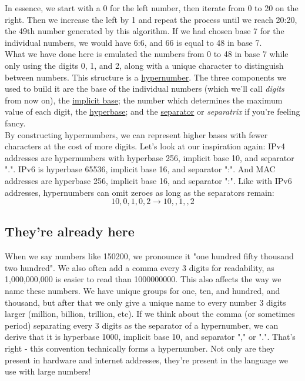 \documentclass{article}
\begin{document}
\noindent In essence, we start with a 0 for the left number, then iterate from 0 to 20 on the right. Then we increase the left by 1 and repeat the process until we reach 20:20, the 49th number generated by this algorithm. If we had chosen base 7 for the individual numbers, we would have 6:6, and 66 is equal to 48 in base 7.\\

\noindent What we have done here is emulated the numbers from 0 to 48 in base 7 while only using the digits 0, 1, and 2, along with a unique character to distinguish between numbers. This structure is a \underline{hypernumber}. The three components we used to build it are the base of the individual numbers (which we'll call \textit{digits} from now on), the \underline{implicit base}; the number which determines the maximum value of each digit, the \underline{hyperbase}; and the \underline{separator} or \textit{separatrix} if you're feeling fancy.\\

\noindent By constructing hypernumbers, we can represent higher bases with fewer characters at the cost of more digits. Let's look at our inspiration again: IPv4 addresses are hypernumbers with hyperbase 256, implicit base 10, and separator ".". IPv6 is hyperbase 65536, implicit base 16, and separator ":". And MAC addresses are hyperbase 256, implicit base 16, and separator ":". Like with IPv6 addresses, hypernumbers can omit zeroes as long as the separators remain:\\

$$10,0,1,0,2 \rightarrow 10,,1,,2$$

\subsection*{They're already here}

When we say numbers like 150200, we pronounce it "one hundred fifty thousand two hundred". We also often add a comma every 3 digits for readability, as 1,000,000,000 is easier to read than 1000000000. This also affects the way we name these numbers. We have unique groups for one, ten, and hundred, and thousand, but after that we only give a unique name to every number 3 digits larger (million, billion, trillion, etc). If we think about the comma (or sometimes period) separating every 3 digits as the separator of a hypernumber, we can derive that it is hyperbase 1000, implicit base 10, and separator "," or ".". That's right - this convention technically forms a hypernumber. Not only are they present in hardware and internet addresses, they're present in the language we use with large numbers!\\
\end{document}
